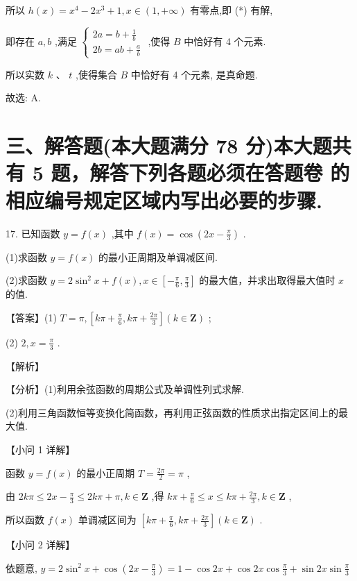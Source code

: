 \documentclass[10pt]{article}
\newcommand*\circled[1]{\tikz[baseline=(char.base)]{\node[shape=circle,draw,inner sep=1.5pt] (char) {\small #1};}}
\begin{document}
所以 \(h\left( x\right)  = {x}^{4} - 2{x}^{3} + 1,x \in  \left( {1, + \infty }\right)\) 有零点,即 (*) 有解,

即存在 \(a,b\) ,满足 \(\left\{  \begin{array}{l} {2a} = b + \frac{1}{b} \\  {2b} = {ab} + \frac{a}{b} \end{array}\right.\) ,使得 \(B\) 中恰好有 4 个元素.

所以实数 \(k\text{ 、 }t\) ,使得集合 \(B\) 中恰好有 4 个元素, \circled{2}  是真命题.

故选: A.

\section*{三、解答题(本大题满分 78 分)本大题共有 5 题，解答下列各题必须在答题卷 的相应编号规定区域内写出必要的步骤.}

17. 已知函数 \(y = f\left( x\right)\) ,其中 \(f\left( x\right)  = \cos \left( {{2x} - \frac{\pi }{3}}\right)\) .

(1)求函数 \(y = f\left( x\right)\) 的最小正周期及单调减区间.

(2)求函数 \(y = 2{\sin }^{2}x + f\left( x\right) ,x \in  \left\lbrack  {-\frac{\pi }{6},\frac{\pi }{3}}\right\rbrack\) 的最大值，并求出取得最大值时 \(x\) 的值.

【答案】(1) \(T = \pi ,\left\lbrack  {{k\pi } + \frac{\pi }{6},{k\pi } + \frac{2\pi }{3}}\right\rbrack  \left( {k \in  \mathbf{Z}}\right)\) ;

(2) \(2,x = \frac{\pi }{3}\) .

【解析】

【分析】(1)利用余弦函数的周期公式及单调性列式求解.

(2)利用三角函数恒等变换化简函数，再利用正弦函数的性质求出指定区间上的最大值.

【小问 1 详解】

函数 \(y = f\left( x\right)\) 的最小正周期 \(T = \frac{2\pi }{2} = \pi\) ,

由 \({2k\pi } \leq  {2x} - \frac{\pi }{3} \leq  {2k\pi } + \pi ,k \in  \mathbf{Z}\) ,得 \({k\pi } + \frac{\pi }{6} \leq  x \leq  {k\pi } + \frac{2\pi }{3},k \in  \mathbf{Z}\) ,

所以函数 \(f\left( x\right)\) 单调减区间为 \(\left\lbrack  {{k\pi } + \frac{\pi }{6},{k\pi } + \frac{2\pi }{3}}\right\rbrack  \left( {k \in  \mathbf{Z}}\right)\) .

【小问 2 详解】

依题意, \(y = 2{\sin }^{2}x + \cos \left( {{2x} - \frac{\pi }{3}}\right)  = 1 - \cos {2x} + \cos {2x}\cos \frac{\pi }{3} + \sin {2x}\sin \frac{\pi }{3}\)
\end{document}
